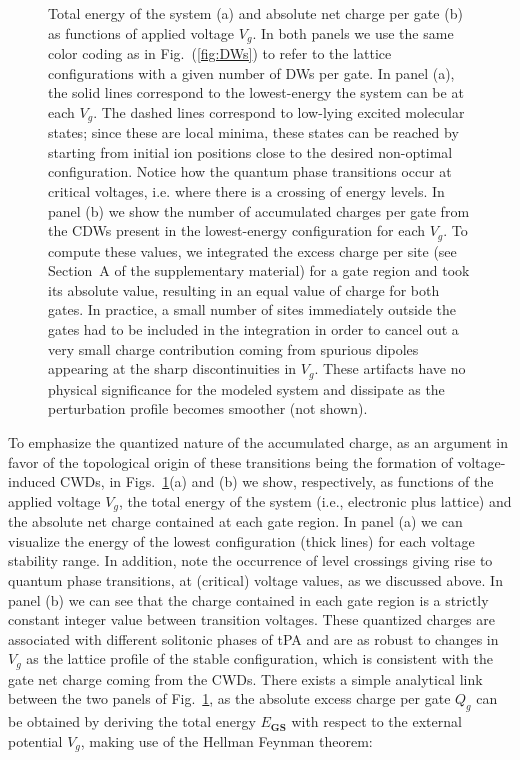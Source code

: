 \documentclass[10pt,a4paper]{article}
\begin{document}
\begin{figure}
    \caption{Total energy of the system (a) and absolute net charge per gate (b) as functions of applied voltage $V_{g}$. In both panels we use the same color coding as in Fig.~(\ref{fig:DWs}) to refer to the lattice configurations with a given number of DWs per gate. In panel (a), the solid lines correspond to the lowest-energy the system can be at each $V_{g}$. The dashed lines correspond to low-lying excited molecular states; since these are local minima, these states can be reached by starting from initial ion positions close to the desired non-optimal configuration. Notice how the quantum phase transitions occur at critical voltages, i.e. where there is a crossing of energy levels. In panel (b) we show the number of accumulated charges per gate from the CDWs present in the lowest-energy configuration for each $V_{g}$. To compute these values, we integrated the excess charge per site (see Section~A of the supplementary material) for a gate region and took its absolute value, resulting in an equal value of charge for both gates. In practice, a small number of sites immediately outside the gates had to be included in the integration in order to cancel out a very small charge contribution coming from spurious dipoles appearing at the sharp discontinuities in $V_{g}$. These artifacts have no physical significance for the modeled system and dissipate as the perturbation profile becomes smoother (not shown).
}
\label{fig:energy_and_charge}
\end{figure}
%
To emphasize the quantized nature of the accumulated charge, as an argument in favor of the topological origin of these transitions being the formation of voltage-induced CWDs, in Figs.~\ref{fig:energy_and_charge}(a) and (b) we show, respectively, as functions of the applied voltage $V_{g}$, the total energy of the system (i.e., electronic plus lattice) and the absolute net charge contained at each gate region. In panel (a) we can visualize the energy of the lowest configuration (thick lines) for each voltage stability range. In addition, note the occurrence of level crossings giving rise to quantum phase transitions, at (critical) voltage values, as we discussed above. In panel (b) we can see that the charge contained in each gate region is a strictly constant integer value between transition voltages. These quantized charges are associated with different solitonic phases of tPA and are as robust to changes in $V_{g}$ as the lattice profile of the  stable configuration, which is consistent with the gate net charge coming from the CWDs. There exists a simple analytical link between the two panels of Fig.~\ref{fig:energy_and_charge}, as the absolute excess charge per gate $Q_{g}$ can be obtained by deriving the total energy $E_{\textbf{GS}}$ with respect to the external potential $V_{g}$, making use of the Hellman Feynman theorem:
\end{document}
